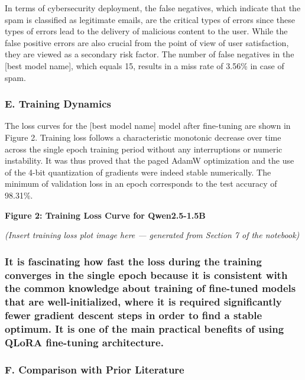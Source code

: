 In terms of cybersecurity deployment, the false negatives, which
indicate that the spam is classified as legitimate emails, are the
critical types of errors since these types of errors lead to the
delivery of malicious content to the user. While the false positive
errors are also crucial from the point of view of user satisfaction,
they are viewed as a secondary risk factor. The number of false
negatives in the {[}best model name{]}, which equals 15, results in a
miss rate of 3.56\% in case of spam.

\subsubsection{E. Training Dynamics}\label{e.-training-dynamics}

The loss curves for the {[}best model name{]} model after fine-tuning
are shown in Figure 2. Training loss follows a characteristic monotonic
decrease over time across the single epoch training period without any
interruptions or numeric instability. It was thus proved that the paged
AdamW optimization and the use of the 4-bit quantization of gradients
were indeed stable numerically. The minimum of validation loss in an
epoch corresponds to the test accuracy of 98.31\%.

\textbf{Figure 2: Training Loss Curve for Qwen2.5-1.5B}

\emph{(Insert training loss plot image here --- generated from Section 7
of the notebook)}

\subsubsection{It is fascinating how fast the loss during the training
converges in the single epoch because it is consistent with the common
knowledge about training of fine-tuned models that are well-initialized,
where it is required significantly fewer gradient descent steps in order
to find a stable optimum. It is one of the main practical benefits of
using QLoRA fine-tuning
architecture.}\label{it-is-fascinating-how-fast-the-loss-during-the-training-converges-in-the-single-epoch-because-it-is-consistent-with-the-common-knowledge-about-training-of-fine-tuned-models-that-are-well-initialized-where-it-is-required-significantly-fewer-gradient-descent-steps-in-order-to-find-a-stable-optimum.-it-is-one-of-the-main-practical-benefits-of-using-qlora-fine-tuning-architecture.}

\subsubsection{F. Comparison with Prior
Literature}\label{f.-comparison-with-prior-literature}

